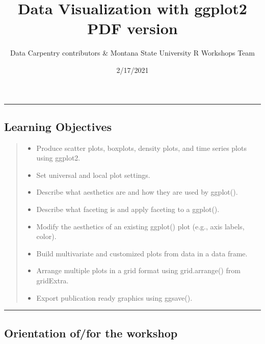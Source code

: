\documentclass[
]{article}
\title{Data Visualization with ggplot2 PDF version}
\author{Data Carpentry contributors \& Montana State University R
Workshops Team}
\date{2/17/2021}
\providecommand{\tightlist}{%
  \setlength{\itemsep}{0pt}\setlength{\parskip}{0pt}}
\begin{document}
\maketitle

\begin{center}\rule{0.5\linewidth}{0.5pt}\end{center}

\hypertarget{learning-objectives}{%
\subsection{Learning Objectives}\label{learning-objectives}}

\begin{quote}
\begin{itemize}
\tightlist
\item
  Produce scatter plots, boxplots, density plots, and time series plots
  using ggplot2.
\item
  Set universal and local plot settings.
\item
  Describe what aesthetics are and how they are used by ggplot().
\item
  Describe what faceting is and apply faceting to a ggplot().
\item
  Modify the aesthetics of an existing ggplot() plot (e.g., axis labels,
  color).
\item
  Build multivariate and customized plots from data in a data frame.
\item
  Arrange multiple plots in a grid format using grid.arrange() from
  gridExtra.
\item
  Export publication ready graphics using ggsave().
\end{itemize}
\end{quote}

\begin{center}\rule{0.5\linewidth}{0.5pt}\end{center}

\hypertarget{orientation-offor-the-workshop}{%
\subsection{Orientation of/for the
workshop}\label{orientation-offor-the-workshop}}
\end{document}
